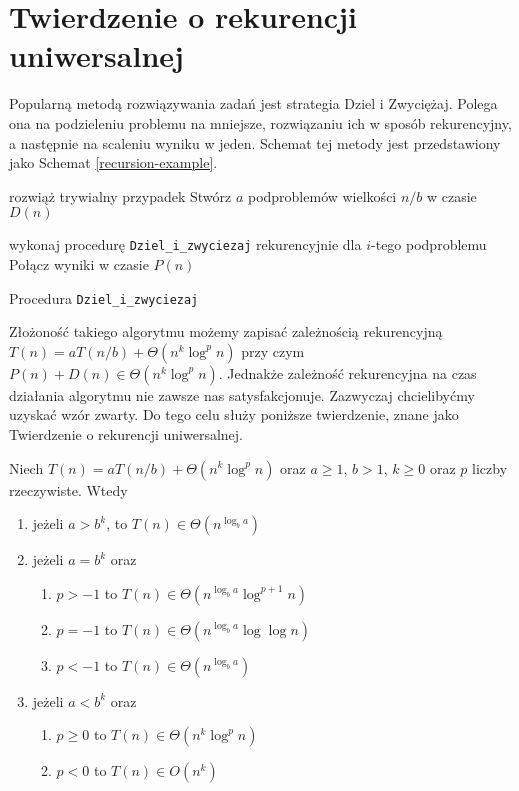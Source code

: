 \section{Twierdzenie o rekurencji uniwersalnej}

\label{sec:mastertheorem}

Popularną metodą rozwiązywania zadań jest strategia Dziel i Zwyciężaj.
Polega ona na podzieleniu problemu na mniejsze, rozwiązaniu ich w sposób rekurencyjny, a następnie na scaleniu wyniku w jeden.
Schemat tej metody jest przedstawiony jako Schemat \ref{recursion-example}.
\begin{algorithm}[h]
  \DontPrintSemicolon
    
  {
    rozwiąż trywialny przypadek
  }
  Stwórz $a$ podproblemów wielkości $n/b$ w czasie $D(n)$
  
  
  {
   	wykonaj procedurę \texttt{Dziel\_i\_zwyciezaj} rekurencyjnie dla $i$-tego podproblemu
  }
  Połącz wyniki w czasie $P(n)$
  \caption{Procedura \texttt{Dziel\_i\_zwyciezaj}}
  \label{recursion-example}
\end{algorithm}

Złożoność takiego algorytmu możemy zapisać zależnością rekurencyjną $T(n) = aT(n/b) + \Theta(n^k \log^{p} n)$ przy czym $P(n) + D(n) \in \Theta(n^k \log^{p} n)$.
Jednakże zależność rekurencyjna na czas działania algorytmu nie zawsze nas satysfakcjonuje.
Zazwyczaj chcielibyćmy uzyskać wzór zwarty.
Do tego celu służy poniższe twierdzenie, znane jako Twierdzenie o rekurencji uniwersalnej.

\begin{theorem}
 Niech $T(n) = aT(n/b) + \Theta(n^k \log^{p} n)$ oraz $a \geq 1$, $b > 1$, $k \geq 0$ oraz $p$ liczby rzeczywiste.
 Wtedy
\begin{enumerate}
\item jeżeli $a > b^k$, to $T(n) \in \Theta(n^{\log_b a})$ \label{mt-1}
\item jeżeli $a = b^k$ oraz 
\begin{enumerate}
 \item $p > -1$ to $T(n) \in \Theta(n^{\log_b a} \log^{p + 1} n)$ \label{mt-2a}
 \item $p = -1$ to $T(n) \in \Theta(n^{\log_b a} \log \log n)$ \label{mt-2b}
 \item $p < -1$ to $T(n) \in \Theta(n^{\log_b a})$ \label{mt-2c}
\end{enumerate}
\item jeżeli $a < b^k$ oraz
\begin{enumerate}
 \item $p \geq 0$ to $T(n) \in \Theta(n^k \log^{p} n)$ \label{mt-3a}
 \item $p < 0$ to $T(n) \in O(n^k)$ \label{mt-3b}
\end{enumerate}
\end{enumerate}
 \label{Master}
\end{theorem}

